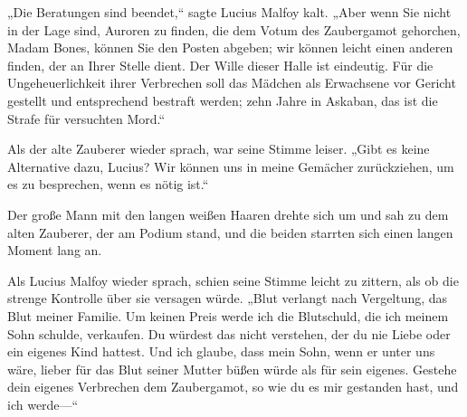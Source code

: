 „Die Beratungen sind beendet,“ sagte Lucius Malfoy kalt. „Aber wenn Sie nicht in der Lage sind, Auroren zu finden, die dem Votum des Zaubergamot gehorchen, Madam Bones, können Sie den Posten abgeben; wir können leicht einen anderen finden, der an Ihrer Stelle dient. Der Wille dieser Halle ist eindeutig. Für die Ungeheuerlichkeit ihrer Verbrechen soll das Mädchen als Erwachsene vor Gericht gestellt und entsprechend bestraft werden; zehn Jahre in Askaban, das ist die Strafe für versuchten Mord.“

Als der alte Zauberer wieder sprach, war seine Stimme leiser.
„Gibt es keine Alternative dazu, Lucius? Wir können uns in meine Gemächer zurückziehen, um es zu besprechen, wenn es nötig ist.“

Der große Mann mit den langen weißen Haaren drehte sich um und sah zu dem alten Zauberer, der am Podium stand, und die beiden starrten sich einen langen Moment lang an.

Als Lucius Malfoy wieder sprach, schien seine Stimme leicht zu zittern, als ob die strenge Kontrolle über sie versagen würde.
„Blut verlangt nach Vergeltung, das Blut meiner Familie. Um keinen Preis werde ich die Blutschuld, die ich meinem Sohn schulde, verkaufen. Du würdest das nicht verstehen, der du nie Liebe oder ein eigenes Kind hattest. Und ich glaube, dass mein Sohn, wenn er unter uns wäre, lieber für das Blut seiner Mutter büßen würde als für sein eigenes. Gestehe dein eigenes Verbrechen dem Zaubergamot, so wie du es mir gestanden hast, und ich werde—“

